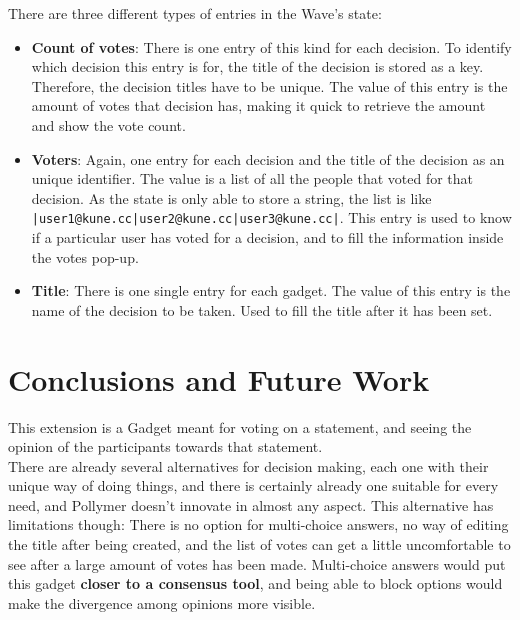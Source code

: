 There are three different types of entries in the Wave's state:
\begin{itemize}
  \item \textbf{Count of votes}: There is one entry of this kind for each decision. To identify which decision this entry is for, the title of the decision is stored as a key. Therefore, the decision titles have to be unique. The value of this entry is the amount of votes that decision has, making it quick to retrieve the amount and show the vote count.
  \item \textbf{Voters}: Again, one entry for each decision and the title of the decision as an unique identifier. The value is a list of all the people that voted for that decision. As the state is only able to store a string, the list is like \verb+|user1@kune.cc|user2@kune.cc|user3@kune.cc|+. This entry is used to know if a particular user has voted for a decision, and to fill the information inside the votes pop-up.
  \item \textbf{Title}: There is one single entry for each gadget. The value of this entry is the name of the decision to be taken. Used to fill the title after it has been set.
\end{itemize}
\section{Conclusions and Future Work}
This extension is a Gadget meant for voting on a statement, and seeing the opinion of the participants towards that statement.\\[.2cm]
There are already several alternatives for decision making, each one with their unique way of doing things, and there is certainly already one suitable for every need, and Pollymer doesn't innovate in almost any aspect. This alternative has limitations though: There is no option for multi-choice answers, no way of editing the title after being created, and the list of votes can get a little uncomfortable to see after a large amount of votes has been made. Multi-choice answers would put this gadget \textbf{closer to a consensus tool}, and being able to block options would make the divergence among opinions more visible.
